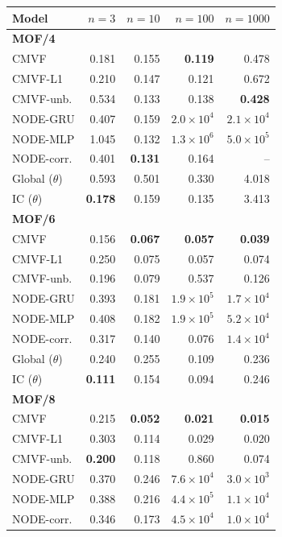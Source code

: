 \begin{tabular*}{\linewidth}{@{\extracolsep{\fill}}lrrrr}
\toprule
Model & $n=3$ & $n=10$ & $n=100$ & $n=1000$ \\
\midrule
\multicolumn{5}{l}{\textbf{MOF/4}} \\
CMVF & 0.181 & 0.155 & \textbf{0.119} & 0.478 \\
CMVF-L1 & 0.210 & 0.147 & 0.121 & 0.672 \\
CMVF-unb. & 0.534 & 0.133 & 0.138 & \textbf{0.428} \\
NODE-GRU & 0.407 & 0.159 & $2.0\!\times\!10^{4}$ & $2.1\!\times\!10^{4}$ \\
NODE-MLP & 1.045 & 0.132 & $1.3\!\times\!10^{6}$ & $5.0\!\times\!10^{5}$ \\
NODE-corr. & 0.401 & \textbf{0.131} & 0.164 & -- \\
Global ($\theta$) & 0.593 & 0.501 & 0.330 & 4.018 \\
IC ($\theta$) & \textbf{0.178} & 0.159 & 0.135 & 3.413 \\
\midrule
\multicolumn{5}{l}{\textbf{MOF/6}} \\
CMVF & 0.156 & \textbf{0.067} & \textbf{0.057} & \textbf{0.039} \\
CMVF-L1 & 0.250 & 0.075 & 0.057 & 0.074 \\
CMVF-unb. & 0.196 & 0.079 & 0.537 & 0.126 \\
NODE-GRU & 0.393 & 0.181 & $1.9\!\times\!10^{5}$ & $1.7\!\times\!10^{4}$ \\
NODE-MLP & 0.408 & 0.182 & $1.9\!\times\!10^{5}$ & $5.2\!\times\!10^{4}$ \\
NODE-corr. & 0.317 & 0.140 & 0.076 & $1.4\!\times\!10^{4}$ \\
Global ($\theta$) & 0.240 & 0.255 & 0.109 & 0.236 \\
IC ($\theta$) & \textbf{0.111} & 0.154 & 0.094 & 0.246 \\
\midrule
\multicolumn{5}{l}{\textbf{MOF/8}} \\
CMVF & 0.215 & \textbf{0.052} & \textbf{0.021} & \textbf{0.015} \\
CMVF-L1 & 0.303 & 0.114 & 0.029 & 0.020 \\
CMVF-unb. & \textbf{0.200} & 0.118 & 0.860 & 0.074 \\
NODE-GRU & 0.370 & 0.246 & $7.6\!\times\!10^{4}$ & $3.0\!\times\!10^{3}$ \\
NODE-MLP & 0.388 & 0.216 & $4.4\!\times\!10^{5}$ & $1.1\!\times\!10^{4}$ \\
NODE-corr. & 0.346 & 0.173 & $4.5\!\times\!10^{4}$ & $1.0\!\times\!10^{4}$ \\

\end{tabular*}
